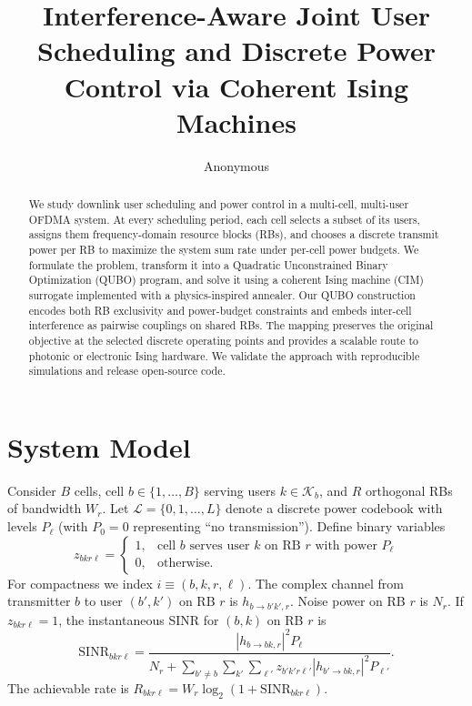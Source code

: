 \documentclass[10pt,conference]{IEEEtran}
\newcommand{\1}{\mathbf{1}}
\begin{document}
\title{Interference-Aware Joint User Scheduling and Discrete Power Control via Coherent Ising Machines}
\author{Anonymous}
\maketitle

\begin{abstract}
We study downlink user scheduling and power control in a multi-cell, multi-user OFDMA system.
At every scheduling period, each cell selects a subset of its users, assigns them frequency-domain resource blocks (RBs),
and chooses a discrete transmit power per RB to maximize the system sum rate under per-cell power budgets.
We formulate the problem, transform it into a Quadratic Unconstrained Binary Optimization (QUBO) program, and
solve it using a coherent Ising machine (CIM) surrogate implemented with a physics-inspired annealer.
Our QUBO construction encodes both RB exclusivity and power-budget constraints and embeds
inter-cell interference as pairwise couplings on shared RBs. The mapping preserves the original
objective at the selected discrete operating points and provides a scalable route to photonic or electronic Ising hardware.
We validate the approach with reproducible simulations and release open-source code.
\end{abstract}

\section{System Model}
Consider $B$ cells, cell $b \in \{1,\dots,B\}$ serving users $k \in \mathcal{K}_b$, and $R$ orthogonal RBs of bandwidth $W_r$.
Let $\mathcal{L}=\{0,1,\dots,L\}$ denote a discrete power codebook with levels $P_\ell$ (with $P_0\!=\!0$ representing ``no transmission'').
Define binary variables
\begin{equation}
z_{bkr\ell}=\begin{cases}
1, & \text{cell $b$ serves user $k$ on RB $r$ with power $P_\ell$}\\
0, & \text{otherwise.}
\end{cases}
\end{equation}
For compactness we index $i\!\equiv\!(b,k,r,\ell)$. The complex channel from transmitter $b$ to user $(b',k')$ on RB $r$ is $h_{b\to b'k',r}$.
Noise power on RB $r$ is $N_r$. If $z_{bkr\ell}\!=\!1$, the instantaneous SINR for $(b,k)$ on RB $r$ is
\begin{equation}
\text{SINR}_{bkr\ell}=\frac{|h_{b\to bk,r}|^2 P_\ell}{N_r+\sum_{b'\neq b}\sum_{k'}\sum_{\ell'}z_{b'k'r\ell'}|h_{b'\to bk,r}|^2 P_{\ell'}}.
\end{equation}
The achievable rate is $R_{bkr\ell}=W_r\log_2(1+\text{SINR}_{bkr\ell})$.
\end{document}
